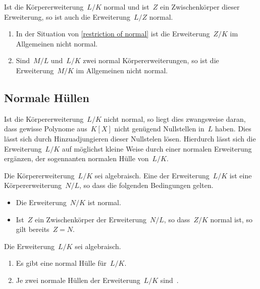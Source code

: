 \begin{proposition}
  \label{restriction of normal}
  Ist die Körpererweiterung~$L/K$ normal und ist~$Z$ ein Zwischenkörper dieser Erweiterung, so ist auch die Erweiterung~$L/Z$ normal.
\end{proposition}

\begin{warning}
  \leavevmode
  \begin{enumerate}
    \item
      In der Situation von \cref{restriction of normal} ist die Erweiterung~$Z/K$ im Allgemeinen nicht normal.
    \item
      Sind~$M/L$ und~$L/K$ zwei normal Körpererweiterungen, so ist die Erweiterung~$M/K$ im Allgemeinen nicht normal.
  \end{enumerate}
\end{warning}



\subsection{Normale Hüllen}

Ist die Körpererweiterung~$L/K$ nicht normal, so liegt dies zwangsweise daran, dass gewisse Polynome aus~$K[X]$ nicht genügend Nullstellen in~$L$ haben.
Dies lässt sich durch Hinzuadjungieren dieser Nullstelen lösen.
Hierdurch lässt sich die Erweiterung~$L/K$ auf möglichst kleine Weise durch einer normalen Erweiterung ergänzen, der sogennanten normalen Hülle von~$L/K$.

\begin{definition}
  Die Körpererweiterung~$L/K$ sei algebraisch.
  Eine  der Erweiterung~$L/K$ ist eine Körpererweiterung~$N/L$, so dass die folgenden Bedingungen gelten.
  \begin{itemize}
    \item
      Die Erweiterung~$N/K$ ist normal.
    \item
      Ist~$Z$ ein Zwischenkörper der Erweiterung~$N/L$, so dass~$Z/K$ normal ist, so gilt bereits~$Z = N$.
  \end{itemize}
\end{definition}

\begin{proposition}
  Die Erweiterung~$L/K$ sei algebraisch.
  \begin{enumerate}
    \item
      Es gibt eine normal Hülle für~$L/K$.
    \item
      Je zwei normale Hüllen der Erweiterung~$L/K$ sind~.
  \end{enumerate}
\end{proposition}





